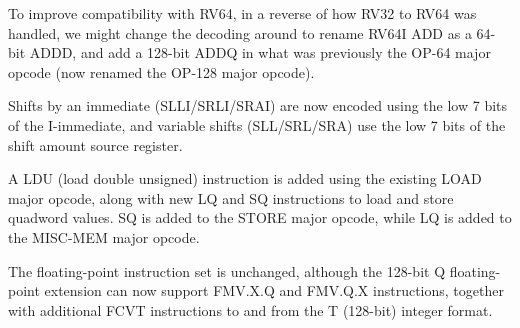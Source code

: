 \begin{commentary}
  To improve compatibility with RV64, in a reverse of how RV32 to RV64
  was handled, we might change the decoding around to rename RV64I ADD
  as a 64-bit ADDD, and add a 128-bit ADDQ in what was previously the
  OP-64 major opcode (now renamed the OP-128 major opcode).
\end{commentary}

Shifts by an immediate (SLLI/SRLI/SRAI) are now encoded using the low
7 bits of the I-immediate, and variable shifts (SLL/SRL/SRA) use the
low 7 bits of the shift amount source register.

A LDU (load double unsigned) instruction is added using the existing
LOAD major opcode, along with new LQ and SQ instructions to load and
store quadword values.  SQ is added to the STORE major opcode, while
LQ is added to the MISC-MEM major opcode.

The floating-point instruction set is unchanged, although the 128-bit
Q floating-point extension can now support FMV.X.Q and FMV.Q.X
instructions, together with additional FCVT instructions to and from
the T (128-bit) integer format.


